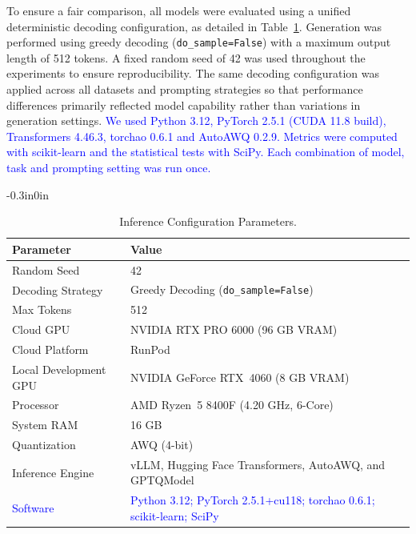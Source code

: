 \documentclass[10pt,letterpaper]{article}
\newcommand{\rev}[1]{\textcolor{blue}{#1}}
\begin{document}
To ensure a fair comparison, all models were evaluated using a unified deterministic decoding configuration, as detailed in Table~\ref{tab:inference}. Generation was performed using greedy decoding (\texttt{do\_sample=False}) with a maximum output length of 512 tokens. A fixed random seed of 42 was used throughout the experiments to ensure reproducibility. The same decoding configuration was applied across all datasets and prompting strategies so that performance differences primarily reflected model capability rather than variations in generation settings. \rev{We used Python 3.12, PyTorch 2.5.1 (CUDA 11.8 build), Transformers 4.46.3, torchao 0.6.1 and AutoAWQ 0.2.9. Metrics were computed with scikit-learn and the statistical tests with SciPy. Each combination of model, task and prompting setting was run once.}


\begin{table}[!t]
\begin{adjustwidth}{-0.3in}{0in}
\centering
\small
\caption{Inference Configuration Parameters.}
\label{tab:inference}
\renewcommand{\arraystretch}{1.2}
\setlength{\tabcolsep}{10pt}

\begin{tabular}{|l|p{9cm}|}
\hline
\textbf{Parameter} & \textbf{Value} \\
\hline

Random Seed & 42 \\\hline
Decoding Strategy & Greedy Decoding (\texttt{do\_sample=False}) \\\hline
Max Tokens & 512 \\\hline

Cloud GPU &
NVIDIA RTX PRO 6000 (96 GB VRAM) \\\hline

Cloud Platform &
RunPod \\\hline

Local Development GPU &
NVIDIA GeForce RTX~4060 (8 GB VRAM) \\\hline

Processor &
AMD Ryzen~5 8400F (4.20 GHz, 6-Core) \\\hline

System RAM &
16 GB \\\hline

Quantization &
AWQ (4-bit) \\\hline

Inference Engine &
vLLM, Hugging Face Transformers, AutoAWQ, and GPTQModel \\ \hline

\rev{Software} &
\rev{Python 3.12; PyTorch 2.5.1+cu118; torchao 0.6.1; scikit-learn; SciPy} \\ \hline

\end{tabular}

\end{adjustwidth}
\end{table}
\end{document}
